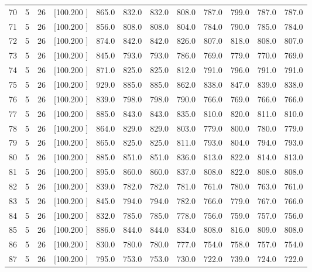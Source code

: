 \documentclass[12pt,a4paper]{article}
\begin{document}
\begin{center}
{\begin{tabular}{r r r r r r r r r r r r}
  70&  5& 26&[100.200   ]&   865.0&   832.0&   832.0&   808.0&   787.0&   799.0&   787.0&   787.0\\[-0.02in]
  71&  5& 26&[100.200   ]&   856.0&   808.0&   808.0&   804.0&   784.0&   790.0&   785.0&   784.0\\[-0.02in]
  72&  5& 26&[100.200   ]&   874.0&   842.0&   842.0&   826.0&   807.0&   818.0&   808.0&   807.0\\[-0.02in]
  73&  5& 26&[100.200   ]&   845.0&   793.0&   793.0&   786.0&   769.0&   779.0&   770.0&   769.0\\[-0.02in]
  74&  5& 26&[100.200   ]&   871.0&   825.0&   825.0&   812.0&   791.0&   796.0&   791.0&   791.0\\[-0.02in]
  75&  5& 26&[100.200   ]&   929.0&   885.0&   885.0&   862.0&   838.0&   847.0&   839.0&   838.0\\[-0.02in]
  76&  5& 26&[100.200   ]&   839.0&   798.0&   798.0&   790.0&   766.0&   769.0&   766.0&   766.0\\[-0.02in]
  77&  5& 26&[100.200   ]&   885.0&   843.0&   843.0&   835.0&   810.0&   820.0&   811.0&   810.0\\[-0.02in]
  78&  5& 26&[100.200   ]&   864.0&   829.0&   829.0&   803.0&   779.0&   800.0&   780.0&   779.0\\[-0.02in]
  79&  5& 26&[100.200   ]&   865.0&   825.0&   825.0&   811.0&   793.0&   804.0&   794.0&   793.0\\[-0.02in]
  80&  5& 26&[100.200   ]&   885.0&   851.0&   851.0&   836.0&   813.0&   822.0&   814.0&   813.0\\[-0.02in]
  81&  5& 26&[100.200   ]&   895.0&   860.0&   860.0&   837.0&   808.0&   822.0&   808.0&   808.0\\[-0.02in]
  82&  5& 26&[100.200   ]&   839.0&   782.0&   782.0&   781.0&   761.0&   780.0&   763.0&   761.0\\[-0.02in]
  83&  5& 26&[100.200   ]&   845.0&   794.0&   794.0&   782.0&   766.0&   779.0&   767.0&   766.0\\[-0.02in]
  84&  5& 26&[100.200   ]&   832.0&   785.0&   785.0&   778.0&   756.0&   759.0&   757.0&   756.0\\[-0.02in]
  85&  5& 26&[100.200   ]&   886.0&   844.0&   844.0&   834.0&   808.0&   816.0&   809.0&   808.0\\[-0.02in]
  86&  5& 26&[100.200   ]&   830.0&   780.0&   780.0&   777.0&   754.0&   758.0&   757.0&   754.0\\[-0.02in]
  87&  5& 26&[100.200   ]&   795.0&   753.0&   753.0&   730.0&   722.0&   739.0&   724.0&   722.0\\[-0.02in]

\end{tabular}}
\end{center}
\end{document}
